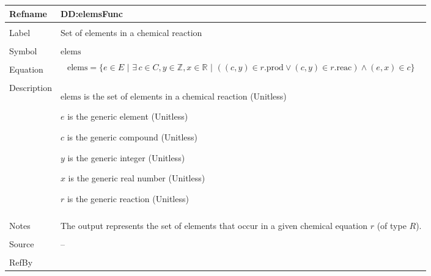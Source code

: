 \documentclass[12pt]{article}
\begin{document}
\vspace{\baselineskip}
\noindent
\begin{minipage}{\textwidth}
\begin{tabular}{>{\raggedright}p{}>{\raggedright\arraybackslash}p{}}
\toprule \textbf{Refname} & \textbf{DD:elemsFunc}
\label{DD:elemsFunc}
\\ \midrule \\
Label & Set of elements in a chemical reaction
        
\\ \midrule \\
Symbol & $\text{elems}$
         
\\ \midrule \\
Equation & \begin{displaymath}
           \text{elems}=\{e\in{}E\text{ | }\exists{}\,c\in{}C,y\in{}\mathbb{Z},x\in{}\mathbb{R}\text{ | }\left(\left(c,y\right)\in{}r\text{.prod}\lor{}\left(c,y\right)\in{}r\text{.reac}\right)\land{}\left(e,x\right)\in{}c\}
           \end{displaymath}
\\ \midrule \\
Description & \begin{symbDescription}
              \item{$\text{elems}$ is the set of elements in a chemical reaction (Unitless)}
              \item{$e$ is the generic element (Unitless)}
              \item{$c$ is the generic compound (Unitless)}
              \item{$y$ is the generic integer (Unitless)}
              \item{$x$ is the generic real number (Unitless)}
              \item{$r$ is the generic reaction (Unitless)}
              \end{symbDescription}
\\ \midrule \\
Notes & The output represents the set of elements that occur in a given chemical equation $r$ (of type $R$).
        
\\ \midrule \\
Source & --
         
\\ \midrule \\
RefBy & 
\\ \bottomrule
\end{tabular}
\end{minipage}
\end{document}
